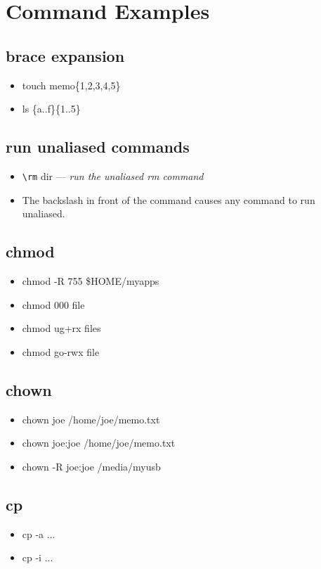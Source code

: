 \documentclass[titlepage]{article}
\begin{document}
    \section{Command Examples}
      \subsection{brace expansion}
        \begin{itemize}
        	\item touch memo\{1,2,3,4,5\}
        	\item ls \{a..f\}\{1..5\}
        \end{itemize}
      \subsection{run unaliased commands}
        \begin{itemize}
        	\item \verb|\rm| dir --- \emph{run the unaliased rm command}
        	\item The backslash in front of the command causes any command to run unaliased.
        \end{itemize}
      \subsection{chmod}
        \begin{itemize}
        	\item chmod -R 755 \$HOME/myapps
        	\item chmod 000 file
        	\item chmod ug+rx files
        	\item chmod go-rwx file
        \end{itemize}
      \subsection{chown}
        \begin{itemize}
        	\item chown joe /home/joe/memo.txt
        	\item chown joe:joe /home/joe/memo.txt
        	\item chown -R joe:joe /media/myusb
        \end{itemize}
      \subsection{cp}
        \begin{itemize}
        	\item cp -a ...
        	\item cp -i ...
        \end{itemize}
\end{document}
